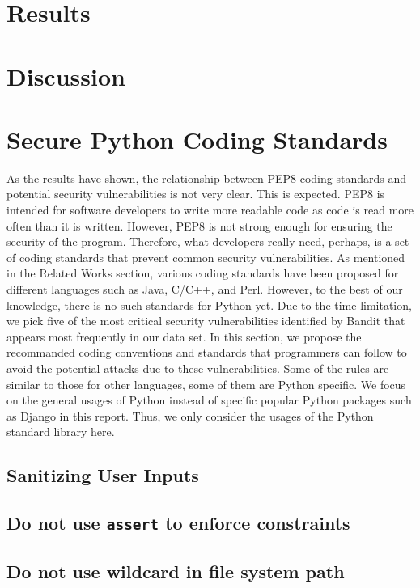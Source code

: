 \documentclass[sigconf]{acmart}
\begin{document}
\section{Results}

\section{Discussion}

\section{Secure Python Coding Standards}
As the results have shown, the relationship between PEP8 coding standards and potential security vulnerabilities is not very clear. This is expected. PEP8 is intended for software developers to write more readable code as code is read more often than it is written\cite{PEP8}. However, PEP8\cite{PEP8} is not strong enough for ensuring the security of the program. Therefore, what developers really need, perhaps, is a set of coding standards that prevent common security vulnerabilities. As mentioned in the Related Works section, various coding standards have been proposed for different languages such as Java, C/C++, and Perl\cite{SEI_CERT}. However, to the best of our knowledge, there is no such standards for Python yet. Due to the time limitation, we pick five of the most critical security vulnerabilities identified by Bandit that appears most frequently in our data set. In this section, we propose the recommanded coding conventions and standards that programmers can follow to avoid the potential attacks due to these vulnerabilities. Some of the rules are similar to those for other languages, some of them are Python specific. We focus on the general usages of Python instead of specific popular Python packages such as Django in this report. Thus, we only consider the usages of the Python standard library here. 

\subsection{Sanitizing User Inputs}

\subsection{Do not use \texttt{assert} to enforce constraints}

\subsection{Do not use wildcard in file system path}
\end{document}
